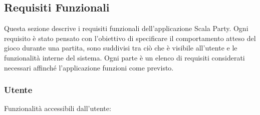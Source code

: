 \subsection{Requisiti Funzionali} \label{sec:functional-requirements}
Questa sezione descrive i requisiti funzionali dell'applicazione Scala Party.
Ogni requisito è stato pensato con l'obiettivo di specificare il comportamento atteso
del gioco durante una partita, sono suddivisi tra ciò che è visibile all'utente e
le funzionalità interne del sistema. Ogni parte è un elenco di requisiti considerati
necessari affinché l'applicazione funzioni come previsto.

\subsubsection{Utente} \label{sec:functional-requirements:user}
Funzionalità accessibili dall'utente:
